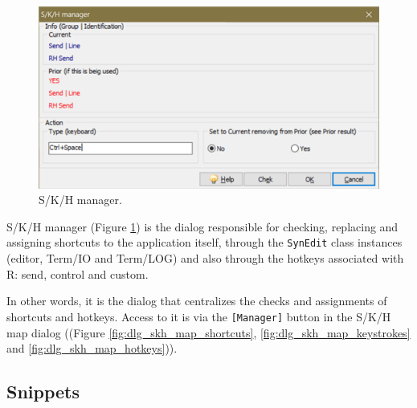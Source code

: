 \begin{figure}[H]
  \begin{center}
    \includegraphics[scale=0.8]{./res/dlg_skh_manager.png}
  \end{center}
  \caption{S/K/H manager.}
  \label{fig:dlg_skh_manager}
\end{figure}
S/K/H manager
(Figure \ref{fig:dlg_skh_manager})
is the dialog responsible for checking, replacing and assigning shortcuts to the application itself,
through the \texttt{SynEdit} class instances (editor, Term/IO and Term/LOG) and also through the hotkeys
associated with R: send, control and custom.

In other words, it is the dialog that centralizes the checks and assignments of shortcuts and hotkeys.
Access to it is via the \texttt{[Manager]} button in the S/K/H map dialog
((Figure \ref{fig:dlg_skh_map_shortcuts},
         \ref{fig:dlg_skh_map_keystrokes} and
         \ref{fig:dlg_skh_map_hotkeys})).


\hypertarget{snippets}{}
\subsection{Snippets}


